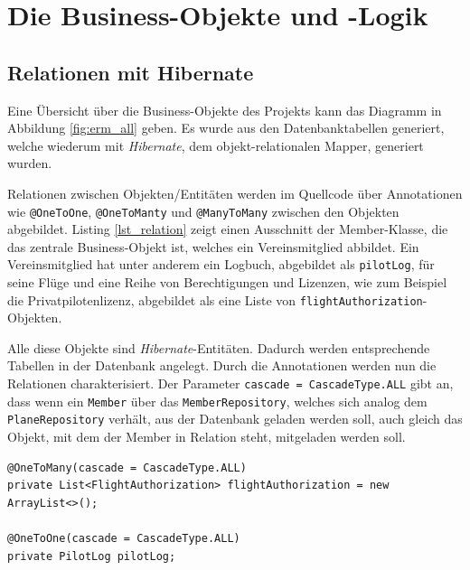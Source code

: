 \documentclass[a4paper, 11pt]{article}
\begin{document}
\section{Die Business-Objekte und -Logik}

\subsection{Relationen mit Hibernate}

Eine Übersicht über die Business-Objekte des Projekts kann das Diagramm in
Abbildung \ref{fig:erm_all} geben. Es wurde aus den Datenbanktabellen
generiert, welche wiederum mit \emph{Hibernate}, dem objekt-relationalen
Mapper, generiert wurden.

Relationen zwischen Objekten/Entitäten werden im Quellcode über Annotationen
wie \lstinline{@OneToOne}, \lstinline{@OneToManty} und \lstinline{@ManyToMany}
zwischen den Objekten abgebildet. Listing \ref{lst_relation} zeigt einen
Ausschnitt der Member-Klasse, die das zentrale Business-Objekt ist, welches ein
Vereinsmitglied abbildet. Ein Vereinsmitglied hat unter anderem ein Logbuch,
abgebildet als \lstinline{pilotLog}, für seine Flüge und eine Reihe von
Berechtigungen und Lizenzen, wie zum Beispiel die Privatpilotenlizenz,
abgebildet als eine Liste von \lstinline{flightAuthorization}-Objekten.

Alle diese Objekte sind \emph{Hibernate}-Entitäten. Dadurch werden
entsprechende Tabellen in der Datenbank angelegt. Durch die Annotationen werden
nun die Relationen charakterisiert. Der Parameter \lstinline{cascade = CascadeType.ALL} gibt an, dass wenn ein \lstinline{Member} über das
\lstinline{MemberRepository}, welches sich analog dem
\lstinline{PlaneRepository} verhält, aus der Datenbank geladen werden soll,
auch gleich das Objekt, mit dem der Member in Relation steht, mitgeladen werden
soll.

\begin{lstlisting}[caption=Verknüpfung zu anderen Entitäten in der Member-Klasse,label=lst_relation]
@OneToMany(cascade = CascadeType.ALL)
private List<FlightAuthorization> flightAuthorization = new ArrayList<>();

@OneToOne(cascade = CascadeType.ALL)
private PilotLog pilotLog;
\end{lstlisting}
\end{document}
